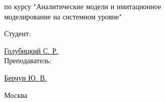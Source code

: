 \begin{center}
{\fontsize{14pt}{16.8pt}\selectfont по курсу "Аналитические модели и имитационное \\
моделирование на системном уровне" \par}
\end{center}\par

\vspace{\baselineskip}
\begin{flushright}
	Студент: \par \underline{Голубицкий С. Р.} \\ 
	Преподаватель:\par \underline{Берчун Ю. В.}
\end{flushright}



\vfill

\begin{center}
{\fontsize{14pt}{16.8pt}\selectfont Москва \the\year\par}
\end{center}\par

\newpage

\newpage
